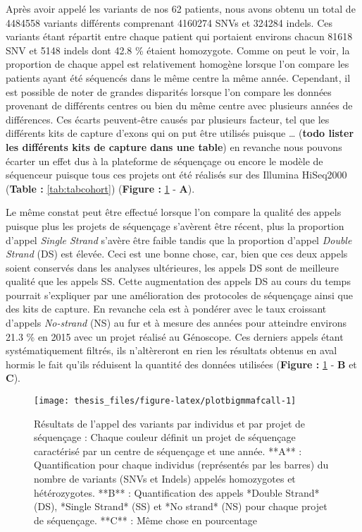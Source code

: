 \documentclass[12pt,twoside]{reedthesis}
\theoremstyle{definition}
\theoremstyle{definition}
\theoremstyle{remark}
\begin{document}
  Après avoir appelé les variants de nos 62 patients, nous avons obtenu un
  total de 4484558 variants différents comprenant 4160274 SNVs et 324284
  indels. Ces variants étant répartit entre chaque patient qui portaient
  environs chacun 81618 SNV et 5148 indels dont 42.8 \% étaient
  homozygote. Comme on peut le voir, la proportion de chaque appel est
  relativement homogène lorsque l'on compare les patients ayant été
  séquencés dans le même centre la même année. Cependant, il est possible
  de noter de grandes disparités lorsque l'on compare les données
  provenant de différents centres ou bien du même centre avec plusieurs
  années de différences. Ces écarts peuvent-être causés par plusieurs
  facteur, tel que les différents kits de capture d'exons qui on put être
  utilisés puisque \ldots{} (\textbf{todo lister les différents kits de
  capture dans une table}) en revanche nous pouvons écarter un effet dus à
  la plateforme de séquençage ou encore le modèle de séquenceur puisque
  tous ces projets ont été réalisés sur des Illumina HiSeq2000
  (\textbf{Table : }\ref{tab:tabcohort}) (\textbf{Figure :
  }\ref{fig:plotbigmmafcall} - \textbf{A}).
  
  Le même constat peut être effectué lorsque l'on compare la qualité des
  appels puisque plus les projets de séquençage s'avèrent être récent,
  plus la proportion d'appel \emph{Single Strand} s'avère être faible
  tandis que la proportion d'appel \emph{Double Strand} (DS) est élevée.
  Ceci est une bonne chose, car, bien que ces deux appels soient conservés
  dans les analyses ultérieures, les appels DS sont de meilleure qualité
  que les appels SS. Cette augmentation des appels DS au cours du temps
  pourrait s'expliquer par une amélioration des protocoles de séquençage
  ainsi que des kits de capture. En revanche cela est à pondérer avec le
  taux croissant d'appels \emph{No-strand} (NS) au fur et à mesure des
  années pour atteindre environs 21.3 \% en 2015 avec un projet réalisé au
  Génoscope. Ces derniers appels étant systématiquement filtrés, ils
  n'altèreront en rien les résultats obtenus en aval hormis le fait qu'ils
  réduisent la quantité des données utilisées (\textbf{Figure :
  }\ref{fig:plotbigmmafcall} - \textbf{B} et \textbf{C}).
  
  \newpage
  
  \begin{figure}
  
  {\centering \texttt{[image: thesis\_files/figure-latex/plotbigmmafcall-1]} 
  
  }
  
  \caption[Résultats de l'appel des variants par individus et par projet de séquençage]{Résultats de l'appel des variants par individus et par projet de séquençage : Chaque couleur définit un projet de séquençage caractérisé par un centre de séquençage et une année. **A** : Quantification pour chaque individus (représentés par les barres) du nombre de variants (SNVs et Indels) appelés homozygotes et hétérozygotes. **B** : Quantification des appels *Double Strand* (DS), *Single Strand* (SS) et *No strand* (NS) pour chaque projet de séquençage. **C** : Même chose en pourcentage}\label{fig:plotbigmmafcall}
  \end{figure}
  
\end{document}
